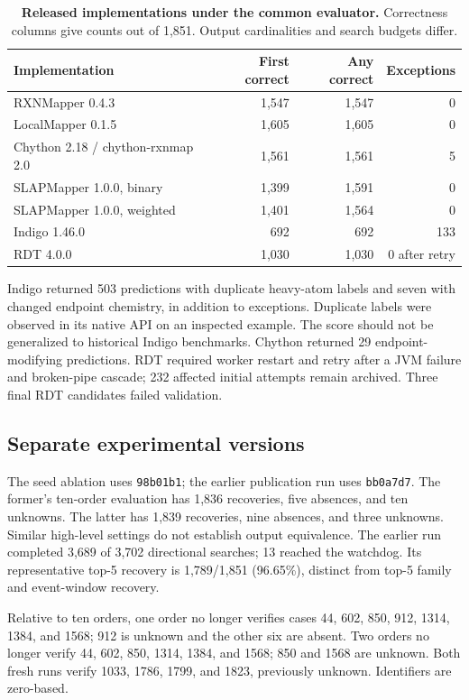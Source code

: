 \begin{table}[h]
\centering\small
\caption{\textbf{Released implementations under the common evaluator.} Correctness columns give counts out of 1,851. Output cardinalities and search budgets differ.}
\label{tab:competitors}
\begin{tabular}{lrrr}\toprule
Implementation & First correct & Any correct & Exceptions\\\midrule
RXNMapper 0.4.3 & 1,547 & 1,547 & 0\\
LocalMapper 0.1.5 & 1,605 & 1,605 & 0\\
Chython 2.18 / chython-rxnmap 2.0 & 1,561 & 1,561 & 5\\
SLAPMapper 1.0.0, binary & 1,399 & 1,591 & 0\\
SLAPMapper 1.0.0, weighted & 1,401 & 1,564 & 0\\
Indigo 1.46.0 & 692 & 692 & 133\\
RDT 4.0.0 & 1,030 & 1,030 & 0 after retry\\\bottomrule
\end{tabular}
\end{table}

Indigo returned 503 predictions with duplicate heavy-atom labels and seven with changed endpoint chemistry, in addition to exceptions. Duplicate labels were observed in its native API on an inspected example. The score should not be generalized to historical Indigo benchmarks. Chython returned 29 endpoint-modifying predictions. RDT required worker restart and retry after a JVM failure and broken-pipe cascade; 232 affected initial attempts remain archived. Three final RDT candidates failed validation.

\subsection{Separate experimental versions}
The seed ablation uses \texttt{98b01b1}; the earlier publication run uses \texttt{bb0a7d7}. The former's ten-order evaluation has 1,836 recoveries, five absences, and ten unknowns. The latter has 1,839 recoveries, nine absences, and three unknowns. Similar high-level settings do not establish output equivalence. The earlier run completed 3,689 of 3,702 directional searches; 13 reached the watchdog. Its representative top-5 recovery is 1,789/1,851 (96.65\%), distinct from top-5 family and event-window recovery.

Relative to ten orders, one order no longer verifies cases 44, 602, 850, 912, 1314, 1384, and 1568; 912 is unknown and the other six are absent. Two orders no longer verify 44, 602, 850, 1314, 1384, and 1568; 850 and 1568 are unknown. Both fresh runs verify 1033, 1786, 1799, and 1823, previously unknown. Identifiers are zero-based.

